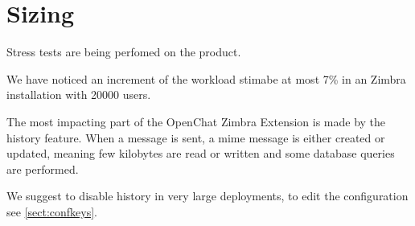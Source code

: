 \section{Sizing}
\label{sect:sizing}

Stress tests are being perfomed on the product.

We have noticed an increment of the workload stimabe at most 7\% in an Zimbra installation with 20000 users.

The most impacting part of the OpenChat Zimbra Extension is made by the history feature. When a message is sent, a mime
message is either created or updated, meaning few kilobytes are read or written and some database queries are performed.

\begin{comment}
TIP:
\end{comment}
\begin{info}
    We suggest to disable history in very large deployments, to edit the configuration see \autoref{sect:confkeys}.
\end{info}
